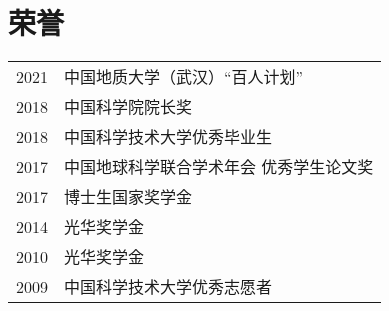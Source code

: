 \section*{荣誉}

\begin{tabular}{p{} p{}}
2021 & 中国地质大学（武汉）“百人计划” \\
2018 & 中国科学院院长奖 \\
2018 & 中国科学技术大学优秀毕业生 \\
2017 & 中国地球科学联合学术年会 优秀学生论文奖 \\
2017 & 博士生国家奖学金 \\
2014 & 光华奖学金 \\
2010 & 光华奖学金 \\
2009 & 中国科学技术大学优秀志愿者 \\
\end{tabular}
